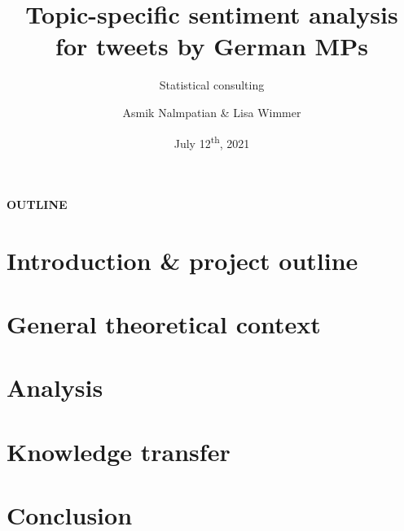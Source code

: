 \documentclass[11pt, t, aspectratio = 1610]{beamer}
\title[Consulting \LaTeX\ Beamer theme]{Topic-specific sentiment analysis for 
tweets by German MPs}
\subtitle{Statistical consulting}
\author{Asmik Nalmpatian \& Lisa Wimmer}
\date{July 12\textsuperscript{th}, 2021}
\begin{document}
{


  
  
  \begin{frame}
    \titlepage
  \end{frame}
  
}	


\begin{frame}[noframenumbering]{}

\vspace{1.5em}
\Large{\textbf{OUTLINE}}

\vfill
\vfill

\tableofcontents

\end{frame}


\section{Introduction \& project outline}
\label{intro}


\section{General theoretical context}
\label{theory}


\section{Analysis}
\label{analysis}


\section{Knowledge transfer}
\label{transfer}


\section{Conclusion}
\label{discussion}

\end{document}
